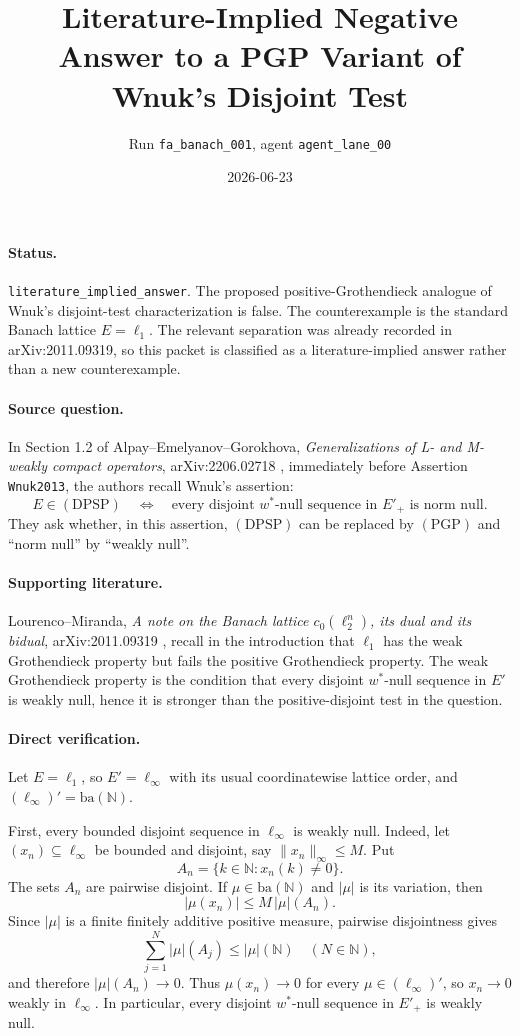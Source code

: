 \documentclass[11pt]{article}
\title{Literature-Implied Negative Answer to a PGP Variant of Wnuk's Disjoint Test}
\author{Run \texttt{fa\_banach\_001}, agent \texttt{agent\_lane\_00}}
\date{2026-06-23}
\newcommand{\ellone}{\ell_1}
\newcommand{\ellinf}{\ell_\infty}
\newcommand{\N}{\mathbb{N}}
\newcommand{\ba}{\mathrm{ba}(\N)}
\newcommand{\wstar}{w^\ast}
\begin{document}
\sloppy
\maketitle

\paragraph{Status.}
\texttt{literature\_implied\_answer}.  The proposed positive-Grothendieck
analogue of Wnuk's disjoint-test characterization is false.  The counterexample
is the standard Banach lattice \(E=\ellone\).  The relevant separation was
already recorded in arXiv:2011.09319, so this packet is classified as a
literature-implied answer rather than a new counterexample.

\paragraph{Source question.}
In Section 1.2 of Alpay--Emelyanov--Gorokhova, \emph{Generalizations of L- and
M-weakly compact operators}, arXiv:2206.02718 \cite{AEG}, immediately before
Assertion \texttt{Wnuk2013}, the authors recall Wnuk's assertion:
\[
  E\in(\mathrm{DPSP})
  \quad\Longleftrightarrow\quad
  \text{every disjoint \(\wstar\)-null sequence in \(E'_+\) is norm null.}
\]
They ask whether, in this assertion, \((\mathrm{DPSP})\) can be replaced by
\((\mathrm{PGP})\) and ``norm null'' by ``weakly null''.

\paragraph{Supporting literature.}
Lourenco--Miranda, \emph{A note on the Banach lattice
\(c_0(\ell_2^n)\), its dual and its bidual}, arXiv:2011.09319 \cite{LM},
recall in the introduction that \(\ellone\) has the weak Grothendieck property
but fails the positive Grothendieck property.  The weak Grothendieck property is
the condition that every disjoint \(\wstar\)-null sequence in \(E'\) is weakly
null, hence it is stronger than the positive-disjoint test in the question.

\paragraph{Direct verification.}
Let \(E=\ellone\), so \(E'=\ellinf\) with its usual coordinatewise lattice
order, and \((\ellinf)'=\ba\).

First, every bounded disjoint sequence in \(\ellinf\) is weakly null.  Indeed,
let \((x_n)\subseteq \ellinf\) be bounded and disjoint, say
\(\|x_n\|_\infty\le M\).  Put
\[
  A_n=\{k\in\N: x_n(k)\ne 0\}.
\]
The sets \(A_n\) are pairwise disjoint.  If \(\mu\in\ba\) and \(|\mu|\) is its
variation, then
\[
  |\mu(x_n)|\le M\,|\mu|(A_n).
\]
Since \(|\mu|\) is a finite finitely additive positive measure, pairwise
disjointness gives
\[
  \sum_{j=1}^N |\mu|(A_j)\le |\mu|(\N)
  \quad (N\in\N),
\]
and therefore \(|\mu|(A_n)\to 0\).  Thus \(\mu(x_n)\to0\) for every
\(\mu\in(\ellinf)'\), so \(x_n\to0\) weakly in \(\ellinf\).  In particular,
every disjoint \(\wstar\)-null sequence in \(E'_+\) is weakly null.
\end{document}
